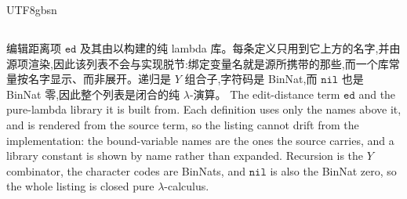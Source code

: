 \begin{CJK*}{UTF8}{gbsn}
  \subsection{}\label{app:editdistance-code}
  \ifTablambdaChinese
  编辑距离项 $\mathtt{ed}$ 及其由以构建的纯 lambda 库。每条定义只用到它上方的名字,并由源项渲染,因此该列表不会与实现脱节:绑定变量名就是源所携带的那些,而一个库常量按名字显示、而非展开。递归是 $Y$ 组合子,字符码是 BinNat,而 $\mathtt{nil}$ 也是 BinNat 零,因此整个列表是闭合的纯 $\lambda$-演算。
  \else
  The edit-distance term $\mathtt{ed}$ and the pure-lambda library it is built from. Each definition uses only the names above it, and is rendered from the source term, so the listing cannot drift from the implementation: the bound-variable names are the ones the source carries, and a library constant is shown by name rather than expanded. Recursion is the $Y$ combinator, the character codes are BinNats, and $\mathtt{nil}$ is also the BinNat zero, so the whole listing is closed pure $\lambda$-calculus.
  \fi
  


\end{CJK*}
